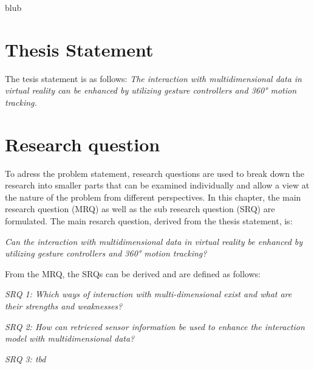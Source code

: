 blub



\section{Thesis Statement}

The tesis statement is as follows: \newline
\textit{The interaction with multidimensional data in virtual reality can be enhanced by utilizing gesture controllers and 360° motion tracking.}



\section{Research question}

To adress the problem statement, research questions are used to break down the research into smaller parts that can be examined individually and allow a view at the nature of the problem from different perspectives.
In this chapter, the main research question (MRQ) as well as the sub research question (SRQ) are formulated. \newline
The main resarch question, derived from the thesis statement, is:
\begin{framed}
	\textit{Can the interaction with multidimensional data in virtual reality be enhanced by utilizing gesture controllers and 360° motion tracking?}
\end{framed}
From the MRQ, the SRQs can be derived and are defined as follows:
\begin{framed}
	\textit{SRQ 1: Which ways of interaction with multi-dimensional exist and what are their strengths and weaknesses?}
\end{framed}
\begin{framed}
	\textit{SRQ 2: How can retrieved sensor information be used to enhance the interaction model with multidimensional data?}
\end{framed}
\begin{framed}
	\textit{SRQ 3: tbd}
\end{framed}


